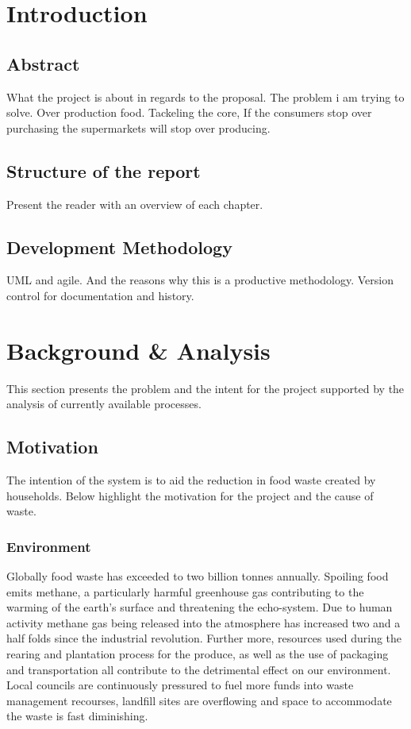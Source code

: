 \documentclass[a4paper, 11pt]{article}
\begin{document}
\setcounter{page}{1}
\section{Introduction}

\subsection{Abstract}
What the project is about in regards to the proposal. The problem i am trying to solve. Over production food.
Tackeling the core, If the consumers stop over purchasing the supermarkets will stop over producing. 


\subsection{Structure of the report}
Present the reader with an overview of each chapter.

\subsection{Development Methodology}
UML and agile. And the reasons why this is a productive methodology.
Version control for documentation and history. 
\clearpage

\section{Background \& Analysis}
This section presents the problem and the intent for the project supported by the analysis of currently available processes. 

\subsection{Motivation}
The intention of the system is to aid the reduction in food waste created by households. Below highlight the motivation for the project and the cause of waste. 

\subsubsection{Environment}
Globally food waste has exceeded to two billion tonnes annually. Spoiling food emits methane, a particularly harmful greenhouse gas contributing to the warming of the earth's surface and threatening the echo-system. Due to human activity methane gas being released into the atmosphere has increased two and a half folds since the industrial revolution. Further more, resources used during the rearing and plantation process for the produce, as well as the use of packaging and transportation all contribute to the detrimental effect on our environment. Local councils are continuously pressured to fuel more funds into waste management recourses, landfill sites are overflowing and space to accommodate the waste is fast diminishing.
\end{document}
